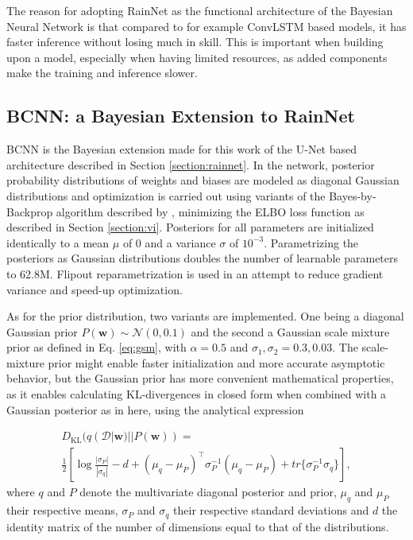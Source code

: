The reason for adopting RainNet as the functional architecture of the Bayesian Neural Network is that compared to for example ConvLSTM based models, it has faster inference without losing much in skill. This is important when building upon a model, especially when having limited resources, as added components make the training and inference slower. 


\subsection{BCNN: a Bayesian Extension to RainNet}

\label{section:bcnn}

BCNN is the Bayesian extension made for this work of the U-Net based architecture described in Section \ref{section:rainnet}. In the network, posterior probability distributions of weights and biases are modeled as diagonal Gaussian distributions and optimization is carried out using variants of the Bayes-by-Backprop algorithm described by \citet{blundell_weight_2015}, minimizing the ELBO loss function as described in Section \ref{section:vi}. Posteriors for all parameters are initialized identically to a mean $\mu$ of 0 and a variance $\sigma$ of $10^{-3}$. Parametrizing the posteriors as Gaussian distributions doubles the number of learnable parameters to 62.8M. Flipout reparametrization \cite{wen_flipout_2018} is used in an attempt to reduce gradient variance and speed-up optimization. 

As for the prior distribution, two variants are implemented. One being a diagonal Gaussian prior $P(\pmb{w}) \sim \mathcal{N}(0,0.1)$ and the second a Gaussian scale mixture prior as defined in Eq. \eqref{eq:gsm}, with $\alpha = 0.5$ and $\sigma_1, \sigma_2 = 0.3, 0.03$. The scale-mixture prior might enable faster initialization and more accurate asymptotic behavior, but the Gaussian prior has more convenient mathematical properties, as it enables calculating KL-divergences in closed form when combined with a Gaussian posterior as in here, using the analytical expression

\begin{multline}
D_{\text{KL}}(q(\mathcal{D}|\pmb{w}) || P(\pmb{w})) =\\
\frac{1}{2}\left[\log \frac{|\sigma_P|}{|\sigma_q|}
- d 
+ (\mu_q - \mu_P)^\top \sigma_P^{-1}(\mu_q - \mu_P)
+ tr\{\sigma_P^{-1}\sigma_q\}
\right],
\end{multline}
%
where $q$ and $P$ denote the multivariate diagonal posterior and prior, $\mu_q$ and $\mu_P$ their respective means, $\sigma_P$ and $\sigma_q$ their respective standard deviations and  $d$ the identity matrix of the number of dimensions equal to that of the distributions. 


